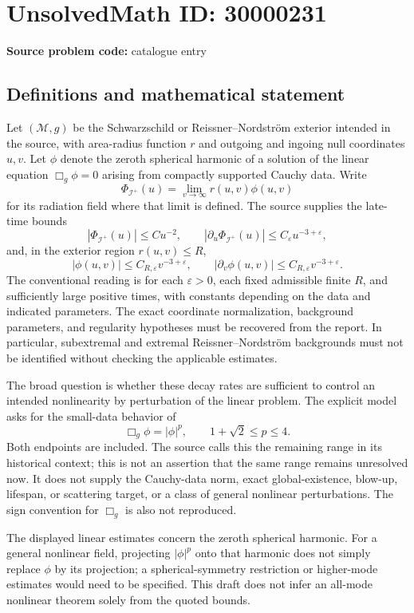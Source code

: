 \documentclass[11pt]{article}
\begin{document}
\section*{UnsolvedMath ID: 30000231}
\textbf{Source problem code:} catalogue entry
\subsection{Definitions and mathematical statement}
Let \((\mathcal M,g)\) be the Schwarzschild or Reissner--Nordstr\"om exterior intended in the source, with area-radius function \(r\) and outgoing and ingoing null coordinates \(u,v\). Let \(\phi\) denote the zeroth spherical harmonic of a solution of the linear equation \(\Box_g\phi=0\) arising from compactly supported Cauchy data. Write
\[
\Phi_{\mathcal I^+}(u)=\lim_{v\to\infty}r(u,v)\phi(u,v)
\]
for its radiation field where that limit is defined. The source supplies the late-time bounds
\[
|\Phi_{\mathcal I^+}(u)|\leq Cu^{-2},\qquad
|\partial_u\Phi_{\mathcal I^+}(u)|\leq C_\varepsilon u^{-3+\varepsilon},
\]
and, in the exterior region \(r(u,v)\leq R\),
\[
|\phi(u,v)|\leq C_{R,\varepsilon}v^{-3+\varepsilon},\qquad
|\partial_v\phi(u,v)|\leq C_{R,\varepsilon}v^{-3+\varepsilon}.
\]
The conventional reading is for each \(\varepsilon>0\), each fixed admissible finite \(R\), and sufficiently large positive times, with constants depending on the data and indicated parameters. The exact coordinate normalization, background parameters, and regularity hypotheses must be recovered from the report. In particular, subextremal and extremal Reissner--Nordstr\"om backgrounds must not be identified without checking the applicable estimates.

The broad question is whether these decay rates are sufficient to control an intended nonlinearity by perturbation of the linear problem. The explicit model asks for the small-data behavior of
\[
\Box_g\phi=|\phi|^p,\qquad 1+\sqrt2\leq p\leq4.
\]
Both endpoints are included. The source calls this the remaining range in its historical context; this is not an assertion that the same range remains unresolved now. It does not supply the Cauchy-data norm, exact global-existence, blow-up, lifespan, or scattering target, or a class of general nonlinear perturbations. The sign convention for \(\Box_g\) is also not reproduced.

The displayed linear estimates concern the zeroth spherical harmonic. For a general nonlinear field, projecting \(|\phi|^p\) onto that harmonic does not simply replace \(\phi\) by its projection; a spherical-symmetry restriction or higher-mode estimates would need to be specified. This draft does not infer an all-mode nonlinear theorem solely from the quoted bounds.
\end{document}
